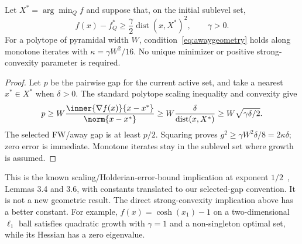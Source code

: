 \begin{proposition}
\label{prop:qg}
Let $X^*=\arg\min_Q f$ and suppose that, on the initial sublevel set,
\[
 f(x)-f_Q^*\ge\frac\gamma2\operatorname{dist}(x,X^*)^2,
 \qquad\gamma>0.
\]
For a polytope of pyramidal width $W$, condition~\eqref{eq:awaygeometry}
holds along monotone iterates with $\kappa=\gamma W^2/16$.
No unique minimizer or positive strong-convexity parameter is required.
\end{proposition}
\begin{proof}
Let $p$ be the pairwise gap for the current active set, and take a
nearest $x^*\in X^*$ when $\delta>0$. The standard polytope scaling
inequality and convexity give
\[
 p\ge W\frac{\inner{\nabla f(x)}{x-x^*}}{\norm{x-x^*}}
   \ge W\frac\delta{\operatorname{dist}(x,X^*)}
   \ge W\sqrt{\gamma\delta/2}.
\]
The selected FW/away gap is at least $p/2$. Squaring proves
$g^2\ge\gamma W^2\delta/8=2\kappa\delta$; zero error is immediate.
Monotone iterates stay in the sublevel set where growth is assumed.
\end{proof}
This is the known scaling/Holderian-error-bound implication at exponent
$1/2$~\cite{restartfw}, Lemmas 3.4 and 3.6, with constants translated
to our selected-gap convention. It is not a new geometric result.
The direct strong-convexity implication above has a better constant.
For example, $f(x)=\cosh(x_1)-1$ on a two-dimensional $\ell_1$ ball
satisfies quadratic growth with $\gamma=1$ and a non-singleton optimal
set, while its Hessian has a zero eigenvalue.

